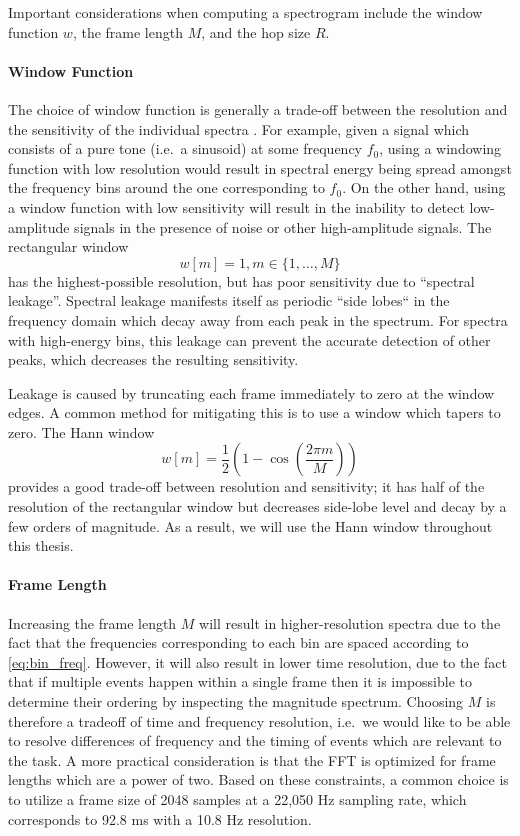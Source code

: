 Important considerations when computing a spectrogram include the window function $w$, the frame length $M$, and the hop size $R$.

\paragraph{Window Function}

The choice of window function is generally a trade-off between the resolution and the sensitivity of the individual spectra \cite{}.
For example, given a signal which consists of a pure tone (i.e.\ a sinusoid) at some frequency $f_0$, using a windowing function with low resolution would result in spectral energy being spread amongst the frequency bins around the one corresponding to $f_0$.
On the other hand, using a window function with low sensitivity will result in the inability to detect low-amplitude signals in the presence of noise or other high-amplitude signals.
The rectangular window
\begin{equation}
        w[m] = 1, m \in \{1, \ldots, M\}
\end{equation}
has the highest-possible resolution, but has poor sensitivity due to ``spectral leakage''.
Spectral leakage manifests itself as periodic ``side lobes`` in the frequency domain which decay away from each peak in the spectrum.
For spectra with high-energy bins, this leakage can prevent the accurate detection of other peaks, which decreases the resulting sensitivity.

Leakage is caused by truncating each frame immediately to zero at the window edges.
A common method for mitigating this is to use a window which tapers to zero.
The Hann window
\begin{equation}
        w[m] = \frac{1}{2}\left(1 - \cos\left(\frac{2\pi m}{M}\right)\right)
\end{equation}
provides a good trade-off between resolution and sensitivity; it has half of the resolution of the rectangular window but decreases side-lobe level and decay by a few orders of magnitude.
As a result, we will use the Hann window throughout this thesis.

\paragraph{Frame Length}

Increasing the frame length $M$ will result in higher-resolution spectra due to the fact that the frequencies corresponding to each bin are spaced according to \cref{eq:bin_freq}.
However, it will also result in lower time resolution, due to the fact that if multiple events happen within a single frame then it is impossible to determine their ordering by inspecting the magnitude spectrum.
Choosing $M$ is therefore a tradeoff of time and frequency resolution, i.e.\ we would like to be able to resolve differences of frequency and the timing of events which are relevant to the task.
A more practical consideration is that the FFT is optimized for frame lengths which are a power of two.
Based on these constraints, a common choice is to utilize a frame size of 2048 samples at a 22,050 Hz sampling rate, which corresponds to 92.8 ms with a 10.8 Hz resolution.

